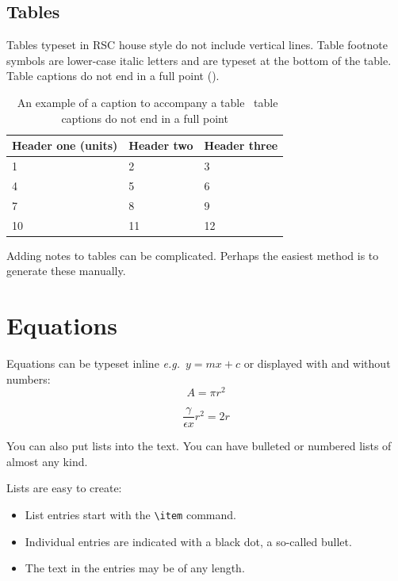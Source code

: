 \documentclass[twoside,twocolumn,9pt]{article}
\begin{document}
{\subsection{Tables}
Tables typeset in RSC house style do not include vertical lines. Table footnote symbols are lower-case italic letters and are typeset at the bottom of the table. Table captions do not end in a full point (\cite{dirac,einstein,knuth-fa}).

\begin{table}[ht]
\small
  \caption{\ An example of a caption to accompany a table \textendash\ table captions do not end in a full point}
  \label{tbl:example1}
  \begin{tabular*}{0.48\textwidth}{@{\extracolsep{\fill}}lll}
    \hline
    Header one (units) & Header two & Header three \\
    \hline
    1 & 2 & 3 \\
    4 & 5 & 6 \\
    7 & 8 & 9 \\
    10 & 11 & 12 \\
    \hline
  \end{tabular*}
\end{table}

Adding notes to tables can be complicated.  Perhaps the easiest method is to generate these manually.

\section{Equations}

Equations can be typeset inline \textit{e.g.}\ $ y = mx + c$ or displayed with and without numbers:
\balance
 \[ A = \pi r^2 \]

\begin{equation}
  \frac{\gamma}{\epsilon x} r^2 = 2r
\end{equation}

You can also put lists into the text. You can have bulleted or numbered lists of almost any kind. 

Lists are easy to create:
\begin{itemize}
  \item List entries start with the \verb|\item| command.
  \item Individual entries are indicated with a black dot, a so-called bullet.
  \item The text in the entries may be of any length.
\end{itemize}

}
\end{document}

